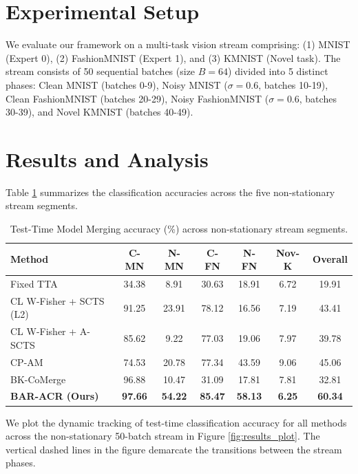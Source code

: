 \documentclass{article}
\theoremstyle{definition}
\theoremstyle{remark}
\begin{document}
\section{Experimental Setup}
We evaluate our framework on a multi-task vision stream comprising: (1) MNIST (Expert 0), (2) FashionMNIST (Expert 1), and (3) KMNIST (Novel task). The stream consists of 50 sequential batches (size $B = 64$) divided into 5 distinct phases: Clean MNIST (batches 0-9), Noisy MNIST ($\sigma = 0.6$, batches 10-19), Clean FashionMNIST (batches 20-29), Noisy FashionMNIST ($\sigma = 0.6$, batches 30-39), and Novel KMNIST (batches 40-49).

\section{Results and Analysis}
Table \ref{tab:results} summarizes the classification accuracies across the five non-stationary stream segments.

\begin{table}[t]
\caption{Test-Time Model Merging accuracy (\%) across non-stationary stream segments.}
\label{tab:results}
\vskip 0.15in
\begin{center}
\begin{small}
\begin{sc}
\begin{tabular}{lcccccc}
\toprule
Method & C-MN & N-MN & C-FN & N-FN & Nov-K & Overall \\
\midrule
Fixed TTA & 34.38 & 8.91 & 30.63 & 18.91 & 6.72 & 19.91 \\
CL W-Fisher + SCTS (L2) & 91.25 & 23.91 & 78.12 & 16.56 & 7.19 & 43.41 \\
CL W-Fisher + A-SCTS & 85.62 & 9.22 & 77.03 & 19.06 & 7.97 & 39.78 \\
CP-AM & 74.53 & 20.78 & 77.34 & 43.59 & 9.06 & 45.06 \\
BK-CoMerge & 96.88 & 10.47 & 31.09 & 17.81 & 7.81 & 32.81 \\
\textbf{BAR-ACR (Ours)} & \textbf{97.66} & \textbf{54.22} & \textbf{85.47} & \textbf{58.13} & \textbf{6.25} & \textbf{60.34} \\
\bottomrule
\end{tabular}
\end{sc}
\end{small}
\end{center}
\vskip -0.1in
\end{table}

We plot the dynamic tracking of test-time classification accuracy for all methods across the non-stationary 50-batch stream in Figure \ref{fig:results_plot}. The vertical dashed lines in the figure demarcate the transitions between the stream phases.
\end{document}
